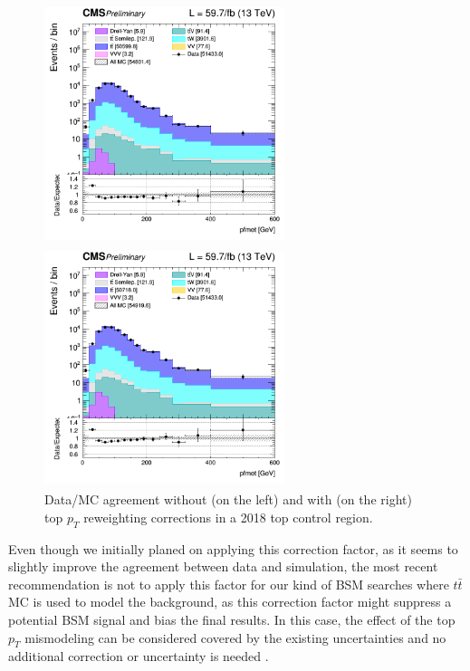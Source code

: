 \documentclass[a4paper, 10pt, openright]{report}
\begin{document}
\begin{figure}[htbp]
\begin{center}
\begin{minipage}[b]{.48\textwidth}
\includegraphics[width=7cm, height=7cm]{figs/log_cratio_ttbarCR_df_METcorrected_pt_customBins_noTopPt.png}
\end{minipage} \hfill
\begin{minipage}[b]{.48\textwidth}
\includegraphics[width=7cm, height=7cm]{figs/log_cratio_ttbarCR_df_METcorrected_pt_customBins.png}
\end{minipage} \hfill
\caption{Data/\ac{MC} agreement without (on the left) and with (on the right) top $p_T$ reweighting corrections in a 2018 top control region.}
\label{fig:Toppt}
\end{center}
\end{figure}

Even though we initially planed on applying this correction factor, as it seems to slightly improve the agreement between data and simulation, the most recent recommendation is not to apply this factor for our kind of \ac{BSM} searches where $t \bar t$ \ac{MC} is used to model the background, as this correction factor might suppress a potential \ac{BSM} signal and bias the final results. In this case, the effect of the top $p_T$ mismodeling can be considered covered by the existing uncertainties and no additional correction or uncertainty is needed \cite{topPtReweighting}.
\end{document}
